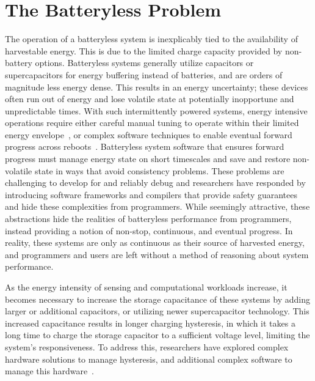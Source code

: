 \section{The Batteryless Problem}
The operation of a batteryless system is inexplicably tied to the availability of harvestable energy.
This is due to the limited charge capacity provided by non-battery options. Batteryless systems generally utilize capacitors or supercapacitors for energy buffering instead of batteries, and are orders of magnitude less energy dense.
This results in an energy uncertainty; these devices often run out of energy and lose volatile state at potentially inopportune and unpredictable times. 
With such intermittently powered systems, energy intensive operations require either careful manual tuning to operate within their limited energy envelope~\cite{yervaGrafting12,campbellEnergy14,debruin2013monjolo}, or complex software techniques to enable eventual forward progress across reboots~\cite{ransford2012mementos,maeng2017alpaca,hesterTimely17}.
Batteryless system software that ensures forward progress must manage energy state on short timescales and save and restore non-volatile state in ways that avoid consistency problems. 
These problems are challenging to develop for and reliably debug and researchers have responded by introducing software frameworks and compilers that provide safety guarantees and hide these complexities from programmers. 
While seemingly attractive, these abstractions hide the realities of batteryless performance from programmers, instead providing a notion of non-stop, continuous, and eventual progress. 
In reality, these systems are only as continuous as their source of harvested energy, and programmers and users are left without a method of reasoning about system performance.


As the energy intensity of sensing and computational workloads increase, it becomes necessary to increase the storage capacitance of these systems by adding larger or additional capacitors, or utilizing newer supercapacitor technology. 
This increased capacitance results in longer charging hysteresis, in which it takes a long time to charge the storage capacitor to a sufficient voltage level, limiting the system's responsiveness.
To address this, researchers have explored complex hardware solutions to manage hysteresis, and additional complex software to manage this hardware~\cite{colinReconfigurable18,hesterFlicker17}.

